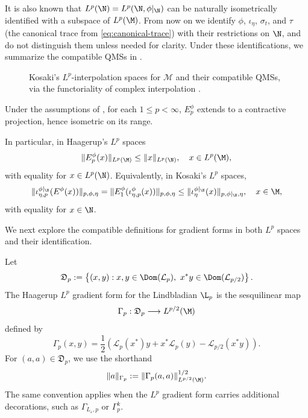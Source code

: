 \documentclass[sn-mathphys-num]{sn-jnl}
\begin{document}
It is also known that $L^p(\N)=L^p(\N,\phi|_\N)$ can be naturally isometrically identified with a subspace of $L^p(\M)$. From now on we identify $\phi$, $\iota_\eta$, $\sigma_t$, and $\tau$
(the canonical trace from \cref{eq:canonical-trace}) with their restrictions on $\N$,
and do not distinguish them unless needed for clarity.
Under these identifications, we summarize the compatible QMSs in .
\begin{figure}[htbp]
  \centering
{}
\caption{Kosaki's $L^p$-interpolation spaces for $\mathcal{M}$ and their compatible QMSs, via the functoriality of complex interpolation \cite{Bergh_Löfström_1976}.}
  \label{fig:int}
\end{figure}
\begin{lemma}\label{lem:norm-eq}
Under the assumptions of , for each $1\le p<\infty$, $E_p^\phi$ extends to a contractive projection, hence isometric on its range.

In particular, in Haagerup's $L^p$ spaces
\[
\|E_p^\phi(x)\|_{L^p(\M)} \le \|x\|_{L^p(\N)}, \quad x\in L^p(\M),
\]
with equality for $x\in L^p(\N)$.
Equivalently, in Kosaki's $L^p$ spaces,
\[
\|\iota^{\phi|_\N}_{\eta,p}(E^\phi(x))\|_{p,\phi,\eta}=\|E_1^\phi(\iota^\phi_{\eta,p}(x))\|_{p,\phi,\eta}\le \|\iota^{\phi|_\N}_\eta (x)\|_{p,\phi|_\N,\eta}, \quad x\in \M,
\]
with equality for $x\in \N$.
\end{lemma}
We next explore the compatible definitions for gradient forms in both $L^p$ spaces and their identification.
\begin{definition}\label{def:GammaLp-h}
Let
\[
\mathfrak D_p
:=
\left\{(x,y):
x,y\in\Dom(\mathcal L_p),\
x^*y\in\Dom(\mathcal L_{p/2})
\right\}.
\]
The Haagerup $L^p$ gradient form for the Lindbladian $\L_p$ is the sesquilinear map
\[
\Gamma_p:\mathfrak D_p\longrightarrow L^{p/2}(\M)
\]
defined by
\begin{equation}\label{eq:gf-h}
\Gamma_p(x,y)
=
\frac12\left(
\mathcal L_p(x^*)y
+x^*\mathcal L_p(y)
-\mathcal L_{p/2}(x^*y)
\right).
\end{equation}
For $(a,a)\in\mathfrak D_p$, we use the shorthand
\[
\|a\|_{\Gamma_p}
:=
\|\Gamma_p(a,a)\|_{L^{p/2}(\M)}^{1/2}.
\]
The same convention applies when the $L^p$ gradient form carries additional
decorations, such as $\Gamma_{L_\varepsilon,p}$ or $\Gamma_p^k$.
\end{definition}
\end{document}
